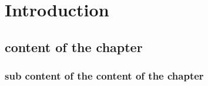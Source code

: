 \chapter{Introduction}
    
    \section{content of the chapter}
    \subsection{sub content of the content of the chapter}
